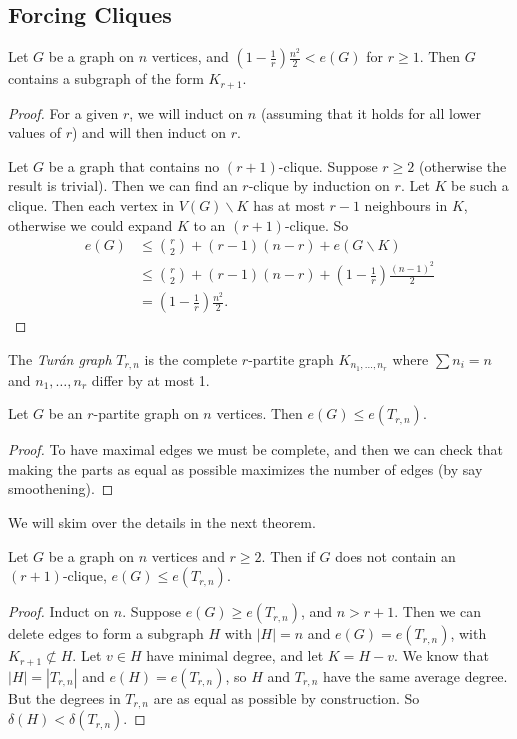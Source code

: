 \documentclass[a3paper, 10pt]{article}
\renewcommand{\vocab}[1]{\emph{#1}}
\begin{document}
\begin{multicols*}{5}
\section{Forcing Cliques}

\begin{theorem}
    Let $G$ be a graph on $n$ vertices, and $(1 - \frac{1}{r}) \frac{n^2}{2} < e(G)$ for $r \geq 1$. Then $G$ contains a subgraph of the form $K_{r + 1}$.
\end{theorem}
\begin{proof}
    For a given $r$, we will induct on $n$ (assuming that it holds for all lower values of $r$) and will then induct on $r$.

    Let $G$ be a graph that contains no $(r + 1)$-clique. Suppose $r \geq 2$ (otherwise the result is trivial). Then we can find an $r$-clique by induction on $r$. Let $K$ be such a clique. Then each vertex in $V(G) \backslash K$ has at most $r - 1$ neighbours in $K$, otherwise we could expand $K$ to an $(r + 1)$-clique. So
    \begin{align*}
    e(G) &\leq \binom{r}{2} + (r - 1)(n - r) + e(G\backslash K) \\
    &\leq \binom{r}{2} + (r - 1)(n - r) + \left(1 - \frac{1}{r}\right)\frac{(n - 1)^2}{2} \\
    &= \left(1 - \frac{1}{r}\right)\frac{n^2}{2}.
    \end{align*}
\end{proof}

\begin{definition}
    The \vocab{Turán graph} $T_{r, n}$ is the complete $r$-partite graph $K_{n_1, \dots, n_r}$ where $\sum n_i = n$ and $n_1, \dots, n_r$ differ by at most 1.
\end{definition}

\begin{proposition}
    Let $G$ be an $r$-partite graph on $n$ vertices. Then $e(G) \leq e(T_{r, n})$.
\end{proposition}
\begin{proof}
    To have maximal edges we must be complete, and then we can check that making the parts as equal as possible maximizes the number of edges (by say smoothening).
\end{proof}

We will skim over the details in the next theorem.

\begin{theorem}
    Let $G$ be a graph on $n$ vertices and $r \geq 2$. Then if $G$ does not contain an $(r + 1)$-clique, $e(G) \leq e(T_{r, n})$.
\end{theorem}
\begin{proof}
    Induct on $n$.
    Suppose $e(G) \geq e(T_{r, n})$, and $n > r + 1$. Then we can delete edges to form a subgraph $H$ with $|H| = n$ and $e(G) = e(T_{r, n})$, with $K_{r + 1} \not \subset H$. Let $v \in H$ have minimal degree, and let $K = H - v$. We know that $|H| = |T_{r, n}|$ and $e(H) = e(T_{r, n})$, so $H$ and $T_{r, n}$ have the same average degree. But the degrees in $T_{r, n}$ are as equal as possible by construction. So $\delta(H) < \delta(T_{r, n})$. 


\end{proof}
\end{multicols*}
\end{document}
